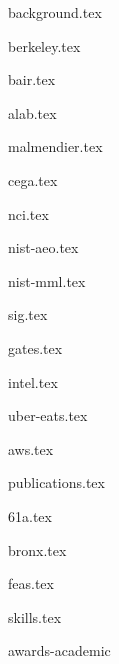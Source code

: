 \documentclass[11pt]{article}
\begin{document}
{background.tex}


{berkeley.tex}


{bair.tex}

{alab.tex}

{malmendier.tex}

{cega.tex}

{nci.tex}

{nist-aeo.tex}

{nist-mml.tex}


{sig.tex}

\newpage
{gates.tex}

{intel.tex}

{uber-eats.tex}

{aws.tex}


{publications.tex}


{61a.tex}

{bronx.tex}

{feas.tex}

{skills.tex}


{awards-academic}
\end{document}
